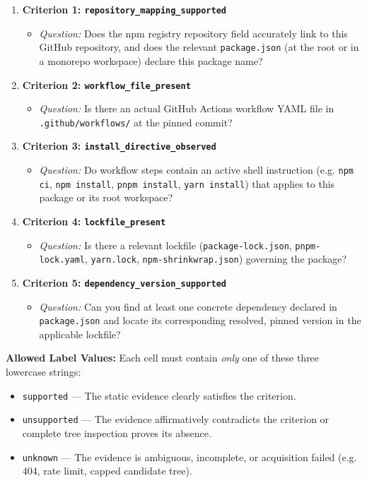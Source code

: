 \documentclass[11pt,a4paper]{article}
\begin{document}
\begin{enumerate}
  \item \textbf{Criterion 1: \nolinkurl{repository_mapping_supported}}
  \begin{itemize}
    \item \textit{Question:} Does the npm registry repository field accurately link to this GitHub repository, and does the relevant \nolinkurl{package.json} (at the root or in a monorepo workspace) declare this package name?
  \end{itemize}
  \item \textbf{Criterion 2: \nolinkurl{workflow_file_present}}
  \begin{itemize}
    \item \textit{Question:} Is there an actual GitHub Actions workflow YAML file in \nolinkurl{.github/workflows/} at the pinned commit?
  \end{itemize}
  \item \textbf{Criterion 3: \nolinkurl{install_directive_observed}}
  \begin{itemize}
    \item \textit{Question:} Do workflow steps contain an active shell instruction (e.g. \nolinkurl{npm ci}, \nolinkurl{npm install}, \nolinkurl{pnpm install}, \nolinkurl{yarn install}) that applies to this package or its root workspace?
  \end{itemize}
  \item \textbf{Criterion 4: \nolinkurl{lockfile_present}}
  \begin{itemize}
    \item \textit{Question:} Is there a relevant lockfile (\nolinkurl{package-lock.json}, \nolinkurl{pnpm-lock.yaml}, \nolinkurl{yarn.lock}, \nolinkurl{npm-shrinkwrap.json}) governing the package?
  \end{itemize}
  \item \textbf{Criterion 5: \nolinkurl{dependency_version_supported}}
  \begin{itemize}
    \item \textit{Question:} Can you find at least one concrete dependency declared in \nolinkurl{package.json} and locate its corresponding resolved, pinned version in the applicable lockfile?
  \end{itemize}
\end{enumerate}

\textbf{Allowed Label Values:} Each cell must contain \textit{only} one of these three lowercase strings:
\begin{itemize}
  \item \nolinkurl{supported} --- The static evidence clearly satisfies the criterion.
  \item \nolinkurl{unsupported} --- The evidence affirmatively contradicts the criterion or complete tree inspection proves its absence.
  \item \nolinkurl{unknown} --- The evidence is ambiguous, incomplete, or acquisition failed (e.g. 404, rate limit, capped candidate tree).
\end{itemize}
\end{document}
